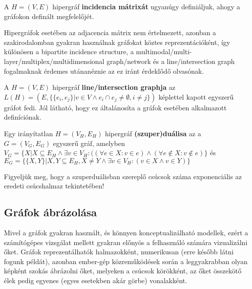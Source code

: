 \begin{definition}
A $H=(V,E)$ hipergráf \textbf{incidencia mátrixát} ugyanúgy definiáljuk, ahogy a gráfokon definált megfelelőjét.
\end{definition}

\begin{note}
Hipergráfok esetében az adjacencia mátrix nem értelmezett, azonban a szakirodalomban gyakran használnak gráfokat köztes reprezentációként, így különösen a bipartite incidence structure, a multimodal/multi-layer/multiplex/multidimensional graph/network és a line/intersection graph fogalmaknak érdemes utánanéznie az ez iránt érdeklődő olvasónak.
\end{note}

\begin{definition}
A $H=(V,E)$ hipergráf \textbf{line/intersection graphja} az $L(H)=(E, \{ \{ e_i, e_j \} | v \in V \land e_i \cap e_j \neq \emptyset, i \neq j \})$ képlettel kapott egyszerű gráfot fedi. Jól látható, hogy ez általánosíta a gráfok esetében alkalmazott definíciónak.
\end{definition}

\begin{definition}
Egy irányítatlan $H=(V_H,E_H)$ hipergráf \textbf{(szuper)duálisa} az a $G=(V_G,E_G)$ egyszerű gráf, amelyben $V_G=\{X | X \subseteq E_H \land \exists v \in V_H : ((\forall e \in X: v \in e) \land (\forall e \notin X : v \notin e) \}$ és $E_G=\{\{X,Y\} | X,Y \subseteq E_H, X \neq Y \land \exists v \in V_H : (v \in X \land v \in Y)\}$
\end{definition}

\begin{note}
Figyeljük meg, hogy a szuperduálisban szereplő csúcsok száma exponenciális az eredeti csúcshalmaz tekintetében!
\end{note}

\subsection{Gráfok ábrázolása}

Mivel a gráfok gyakran használt, és könnyen konceptualizálható modellek, ezért a számítógépes vizsgálat mellett gyakran előnyös a felhasználó számára vizualizálni őket. Gráfok reprezentálhatók halmazokként, numerikusan (erre később látni fogunk példát), azonban ember-gép közreműködések során a leggyakrabban olyan képként szokás ábrázolni őket, melyeken a csúcsok körökként, az őket összekötő élek pedig egyenes (egyes esetekben akár görbe) vonalakként.

